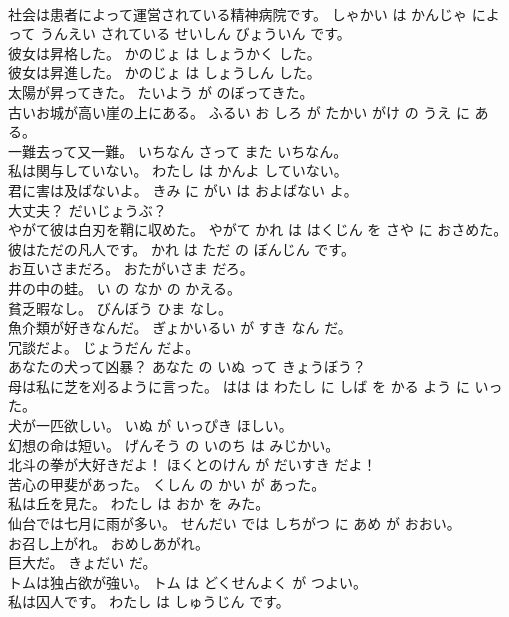 \documentclass[8pt]{extreport}
\begin{document}
\begin{CJK}{UTF8}{min}
\\	社会は患者によって運営されている精神病院です。	しゃかい は かんじゃ によって うんえい されている せいしん びょういん です。	
\\	彼女は昇格した。	かのじょ は しょうかく した。	
\\	彼女は昇進した。	かのじょ は しょうしん した。	
\\	太陽が昇ってきた。	たいよう が のぼってきた。	
\\	古いお城が高い崖の上にある。	ふるい お しろ が たかい がけ の うえ に ある。	
\\	一難去って又一難。	いちなん さって また いちなん。	
\\	私は関与していない。	わたし は かんよ していない。	
\\	君に害は及ばないよ。	きみ に がい は およばない よ。	
\\	大丈夫？	だいじょうぶ？	
\\	やがて彼は白刃を鞘に収めた。	やがて かれ は はくじん を さや に おさめた。	
\\	彼はただの凡人です。	かれ は ただ の ぼんじん です。	
\\	お互いさまだろ。	おたがいさま だろ。	
\\	井の中の蛙。	い の なか の かえる。	
\\	貧乏暇なし。	びんぼう ひま なし。	
\\	魚介類が好きなんだ。	ぎょかいるい が すき なん だ。	
\\	冗談だよ。	じょうだん だよ。	
\\	あなたの犬って凶暴？	あなた の いぬ って きょうぼう？	
\\	母は私に芝を刈るように言った。	はは は わたし に しば を かる よう に いった。	
\\	犬が一匹欲しい。	いぬ が いっぴき ほしい。	
\\	幻想の命は短い。	げんそう の いのち は みじかい。	
\\	北斗の拳が大好きだよ！	ほくとのけん が だいすき だよ！	
\\	苦心の甲斐があった。	くしん の かい が あった。	
\\	私は丘を見た。	わたし は おか を みた。	
\\	仙台では七月に雨が多い。	せんだい では しちがつ に あめ が おおい。	
\\	お召し上がれ。	おめしあがれ。	
\\	巨大だ。	きょだい だ。	
\\	トムは独占欲が強い。	トム は どくせんよく が つよい。	
\\	私は囚人です。	わたし は しゅうじん です。	

\end{CJK}
\end{document}

